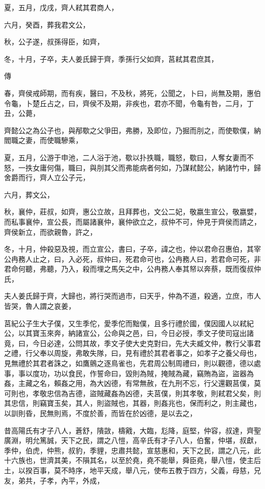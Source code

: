 \documentclass[fontset = none]{ctexart}
\begin{document}
夏，五月，戊戌，齊人弒其君商人，

六月，癸酉，葬我君文公，

秋，公子遂，叔孫得臣，如齊，

冬，十月，子卒，夫人姜氏歸于齊，季孫行父如齊，莒弒其君庶其，

傳



春，齊侯戒師期，而有疾，醫曰，不及秋，將死，公聞之，卜曰，尚無及期，惠伯令龜，卜楚丘占之，曰，齊侯不及期，非疾也，君亦不聞，令龜有咎，二月，丁丑，公薨，

齊懿公之為公子也，與邴歜之父爭田，弗勝，及即位，乃掘而刖之，而使歜僕，納閻職之妻，而使職驂乘，

夏，五月，公游于申池，二人浴于池，歜以扑抶職，職怒，歜曰，人奪女妻而不怒，一抶女庸何傷，職曰，與刖其父而弗能病者何如，乃謀弒懿公，納諸竹中，歸舍爵而行，齊人立公子元，

六月，葬文公，

秋，襄仲，莊叔，如齊，惠公立故，且拜葬也，文公二妃，敬嬴生宣公，敬嬴嬖，而私事襄仲，宣公長，而屬諸襄仲，襄仲欲立之，叔仲不可，仲見于齊侯而請之，齊侯新立，而欲親魯，許之，

冬，十月，仲殺惡及視，而立宣公，書曰，子卒，諱之也，仲以君命召惠伯，其宰公冉務人止之，曰，入必死，叔仲曰，死君命可也，公冉務人曰，若君命可死，非君命何聽，弗聽，乃入，殺而埋之馬矢之中，公冉務人奉其帑以奔蔡，既而復叔仲氏，

夫人姜氏歸于齊，大歸也，將行哭而過市，曰天乎，仲為不道，殺適，立庶，市人皆哭，魯人謂之哀姜，

莒紀公子生大子僕，又生季佗，愛季佗而黜僕，且多行禮於國，僕因國人以弒紀公，以其寶玉來奔，納諸宣公，公命與之邑，曰，今日必授，季文子使司寇出諸竟，曰，今日必達，公問其故，季文子使大史克對曰，先大夫臧文仲，教行父事君之禮，行父奉以周旋，弗敢失隊，曰，見有禮於其君者事之，如孝子之養父母也，見無禮於其君者誅之，如鷹鸇之逐鳥雀也，先君周公制周禮曰，則以觀德，德以處事，事以度功，功以食民，作誓命曰，毀則為賊，掩賊為藏，竊賄為盜，盜器為姦，主藏之名，賴姦之用，為大凶德，有常無赦，在九刑不忘，行父還觀莒僕，莫可則也，孝敬忠信為吉德，盜賊藏姦為凶德，夫莒僕，則其孝敬，則弒君父矣，則其忠信，則竊寶玉矣，其人，則盜賊也，其器，則姦兆也，保而利之，則主藏也，以訓則昏，民無則焉，不度於善，而皆在於凶德，是以去之，

昔高陽氏有才子八人，蒼舒，隤敳，檮戭，大臨，尨降，庭堅，仲容，叔達，齊聖廣淵，明允篤誠，天下之民，謂之八愷，高辛氏有才子八人，伯奮，仲堪，叔獻，季仲，伯虎，仲熊，叔豹，季貍，忠肅共懿，宣慈惠和，天下之民，謂之八元，此十六族也，世濟其美，不隕其名，以至於堯，堯不能舉，舜臣堯，舉八愷，使主后土，以揆百事，莫不時序，地平天成，舉八元，使布五教于四方，父義，母慈，兄友，弟共，子孝，內平，外成，
\end{document}
